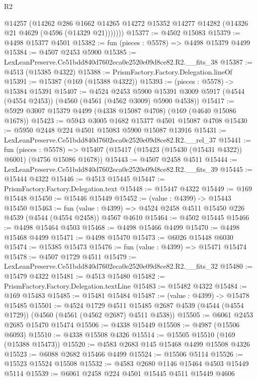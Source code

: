 \begin{lexlean}{R2}
\begin{coremodule}
          @14257
          (@14262
            @286
            @1662
            @14265
            @14272
            @15352
            @14277
            @14282
            (@14326 @21 @4629 (@4596 (@14329 @21)))))))
@15377 := @4502 @15083
@15379 := @4498 @15377 @4501
@15382 := fun (pieces : @5578) => @4498 @15379 @4499
@15384 := @4507 @2453 @5900
@15385 := LexLeanPreserve.Ce51bdd840d7602eca0e2520e09d8ce82.R2.__fits_38
@15387 := @4513 (@15385 @4322)
@15388 := PrismFactory.Factory.Delegation.lineOf
@15391 := @15387 (@169 (@15388 @4322))
@15393 := (pieces : @5578) -> @15384 @15391
@15407 := @4524
    @2453
    @5900
    @15391
    @3009
    @5917
    (@4544 (@4554 @2453))
    (@4560 (@4561 (@4562 @3009) @5900 @4538))
@15417 := @5929 @3007 @15379 @4499 (@4338 @15087 @4708) (@169 (@4640 @15086 @1678))
@15423 := @5943 @3005 @1682 @15377 @4501 @15087 @4708
@15430 := @5950 @2448 @224 @4501 @15083 @5900 @15087 @13916
@15431 := LexLeanPreserve.Ce51bdd840d7602eca0e2520e09d8ce82.R2.__rel_37
@15441 := fun (pieces : @5578) =>
  @15407 (@15417 (@15423 (@15430 (@15431 @4322)) @6001) (@4756 @15086 @1678))
@15443 := @4507 @2458 @4511
@15444 := LexLeanPreserve.Ce51bdd840d7602eca0e2520e09d8ce82.R2.__fits_39
@15445 := @15444 @4322
@15446 := @4513 @15445
@15447 := PrismFactory.Factory.Delegation.text
@15448 := @15447 @4322
@15449 := @169 @15448
@15450 := @15446 @15449
@15452 := (value : @4399) -> @15443 @15450
@15463 := fun (value : @4399) =>
  @4524 @2458 @4511 @15450 @226 @4539 (@4544 (@4554 @2458)) @4567 @4610
@15464 := @4502 @15445
@15466 := @4498 @15464 @4503
@15468 := @4498 @15466 @4499
@15470 := @4498 @15468 @4499
@15471 := @4498 @15470
@15473 := @6026 @15448 @6030
@15474 := @15385 @15473
@15476 := fun (value : @4399) => @15471 @15474
@15478 := @4507 @1729 @4511
@15479 := LexLeanPreserve.Ce51bdd840d7602eca0e2520e09d8ce82.R2.__fits_32
@15480 := @15479 @4322
@15481 := @4513 @15480
@15482 := PrismFactory.Factory.Delegation.textLine
@15483 := @15482 @4322
@15484 := @169 @15483
@15485 := @15481 @15484
@15487 := (value : @4399) -> @15478 @15485
@15501 := @4524
    @1729
    @4511
    @15485
    @2687
    @4539
    (@4544 (@4554 @1729))
    (@4560 (@4561 (@4562 @2687) @4511 @4538))
@15505 := @6061 @2453 @2685 @15470 @15474
@15506 := @4338 @15449
@15508 := @4987 (@15506 @6093)
@15510 := @4338 @15508 @4326
@15514 := @15505 @15510 (@169 (@15388 @15473))
@15520 := @4583 @2683 @145 @15468 @4499 @15508 @4326
@15523 := @6088 @2682 @15466 @4499
@15524 := @15506 @5114
@15526 := @15523 @15524 @15508
@15532 := @4583 @2680 @1146 @15464 @4503 @15449 @5114
@15539 := @6061 @2458 @224 @4501 @15445 @4511 @15449 @4606

\end{coremodule}
\end{lexlean}
